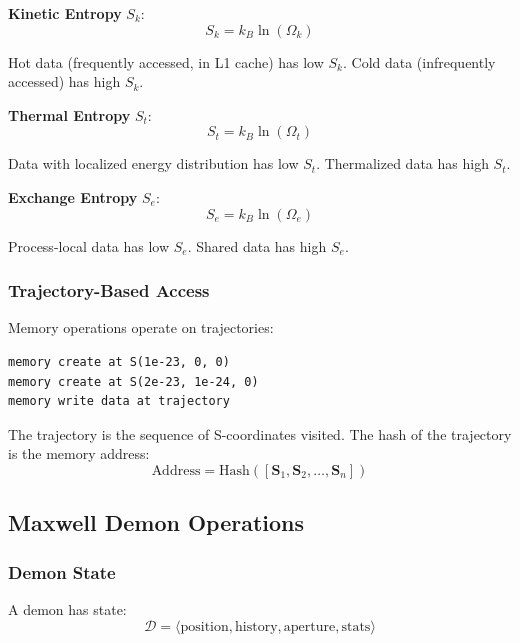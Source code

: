 \documentclass[twocolumn,10pt]{article}
\newcommand{\Scoord}{\mathbf{S}}
\theoremstyle{definition}
\theoremstyle{remark}
\begin{document}
\textbf{Kinetic Entropy} $S_k$:
\begin{equation}
    S_k = k_B \ln(\Omega_k)
\end{equation}

Hot data (frequently accessed, in L1 cache) has low $S_k$. Cold data (infrequently accessed) has high $S_k$.

\textbf{Thermal Entropy} $S_t$:
\begin{equation}
    S_t = k_B \ln(\Omega_t)
\end{equation}

Data with localized energy distribution has low $S_t$. Thermalized data has high $S_t$.

\textbf{Exchange Entropy} $S_e$:
\begin{equation}
    S_e = k_B \ln(\Omega_e)
\end{equation}

Process-local data has low $S_e$. Shared data has high $S_e$.

\subsubsection{Trajectory-Based Access}

Memory operations operate on trajectories:
\begin{lstlisting}
memory create at S(1e-23, 0, 0)
memory create at S(2e-23, 1e-24, 0)
memory write data at trajectory
\end{lstlisting}

The trajectory is the sequence of S-coordinates visited. The hash of the trajectory is the memory address:
\begin{equation}
    \text{Address} = \text{Hash}([\Scoord_1, \Scoord_2, \ldots, \Scoord_n])
\end{equation}

\subsection{Maxwell Demon Operations}

\subsubsection{Demon State}

A demon has state:
\begin{equation}
    \mathcal{D} = \langle\text{position}, \text{history}, \text{aperture}, \text{stats}\rangle
\end{equation}
\end{document}
